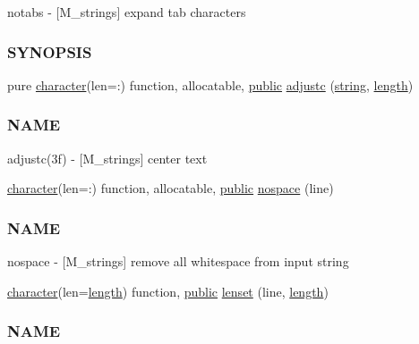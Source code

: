 \begin{DoxyCompactItemize}
\begin{DoxyCompactList}
notabs -\/ \mbox{[}M\+\_\+strings\mbox{]} expand tab characters \subsubsection*{S\+Y\+N\+O\+P\+S\+IS}\end{DoxyCompactList}\item 
pure \hyperlink{option__stopwatch_83_8txt_abd4b21fbbd175834027b5224bfe97e66}{character}(len=\+:) function, allocatable, \hyperlink{M__stopwatch_83_8txt_a2f74811300c361e53b430611a7d1769f}{public} \hyperlink{namespacem__strings_a1cacb2e45c7e3d7ed4cc1b183c35f323}{adjustc} (\hyperlink{what__overview_81_8txt_a74cb7e955273b9f9157b4f0c18a38849}{string}, \hyperlink{M__stopwatch_83_8txt_a04ed5ef37abacfa36a856b5f30376485}{length})
\begin{DoxyCompactList}\small\item\em \subsubsection*{N\+A\+ME}

adjustc(3f) -\/ \mbox{[}M\+\_\+strings\mbox{]} center text \end{DoxyCompactList}\item 
\hyperlink{option__stopwatch_83_8txt_abd4b21fbbd175834027b5224bfe97e66}{character}(len=\+:) function, allocatable, \hyperlink{M__stopwatch_83_8txt_a2f74811300c361e53b430611a7d1769f}{public} \hyperlink{namespacem__strings_ad007f050abe3d142f4a7badbc4408685}{nospace} (line)
\begin{DoxyCompactList}\small\item\em \subsubsection*{N\+A\+ME}

nospace -\/ \mbox{[}M\+\_\+strings\mbox{]} remove all whitespace from input string \end{DoxyCompactList}\item 
\hyperlink{option__stopwatch_83_8txt_abd4b21fbbd175834027b5224bfe97e66}{character}(len=\hyperlink{M__stopwatch_83_8txt_a04ed5ef37abacfa36a856b5f30376485}{length}) function, \hyperlink{M__stopwatch_83_8txt_a2f74811300c361e53b430611a7d1769f}{public} \hyperlink{namespacem__strings_a378563bb49f128bf0cf9c9d2b1f34498}{lenset} (line, \hyperlink{M__stopwatch_83_8txt_a04ed5ef37abacfa36a856b5f30376485}{length})
\begin{DoxyCompactList}\small\item\em \subsubsection*{N\+A\+ME}


\end{DoxyCompactList}
\end{DoxyCompactItemize}
